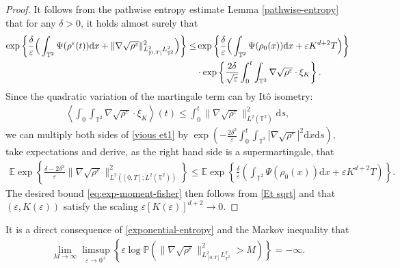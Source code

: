 \begin{proof}
It follows from the pathwise entropy estimate Lemma \ref{pathwise-entropy} that for any $\delta > 0$, it holds almost surely that
\begin{align}\label{vious et1}
  \exp\left\{\frac{\delta }{\varepsilon }\Big(\int_{\mathbb{T}^2}\Psi(\rho^{\varepsilon}(t))\mathrm{d}x+\|\nabla \sqrt{\rho^{\varepsilon}}\|_{L^2_{[0,T]}L^2_{\mathbb{T}^2}}^{2}\Big)\right\}
  \leq&\exp\left\{\frac{\delta}{\varepsilon }\Big(\int_{\mathbb{T}^2}\Psi(\rho_0(x))\mathrm{d}x+\varepsilon K^{d+2}T\Big)\right\}\notag\\
  &\cdot\exp\left\{\frac{2\delta}{\sqrt{\varepsilon}}\int_0^t\int_{\mathbb{T}^2}\nabla\sqrt{\rho^{\varepsilon}}\cdot\xi_K\right\}.
\end{align}
Since the quadratic variation of the martingale term can by It\^o isometry:
\begin{align*}
   \left\langle\int_{0}^{\cdot}\int_{\mathbb{T}^2}
\nabla\sqrt{\rho^{\varepsilon}}\cdot \xi_K\right\rangle(t) \leq \int_{0}^{t}
   \|\nabla\sqrt{\rho^{\varepsilon}}\|_{L^2(\mathbb{T}^2)}^2\mathrm{d}s,
\end{align*}
we can multiply both sides of \eqref{vious et1} by $\exp(
-\frac{2\delta^2}{\varepsilon }\int_{0}^{t}
   \int_{\mathbb{T}^2}|\nabla\sqrt{\rho^{\varepsilon}}|^2\mathrm{d}x\mathrm{d}s)$, take expectations and derive, as the right hand side is a supermartingale, that 
\begin{align}\label{Et sqrt}
\mathbb{E}\exp\left\{\frac{\delta-2\delta^2}{\varepsilon }\|\nabla \sqrt{\rho^{\varepsilon}}\|_{L^2([0,T];L^2(\mathbb{T}^2))}^{2}\right\}\leq \mathbb{E}\exp\left\{\frac{\delta }{\varepsilon }\left(\int_{\mathbb{T}^2}\Psi(\rho_0(x))\mathrm{d}x+\varepsilon K^{d+2}T\right)\right\}.
\end{align}
The desired bound \eqref{eq:exp-moment-fisher} then follows from \eqref{Et sqrt} and that $(\varepsilon, K(\varepsilon))$ satisfy the scaling $\varepsilon [K(\varepsilon)]^{d+2}\rightarrow 0$.
\end{proof}
It is a direct consequence of \eqref{exponential-entropy} and the Markov inequality that  
\begin{align}
\lim_{M\rightarrow \infty}\limsup_{\varepsilon\rightarrow 0^+} \left\{\varepsilon \log\mathbb{P}\left(\|\nabla\sqrt{\rho^{\varepsilon}}\|_{L^2_{[0,T]}L^2_{\mathbb{T}^2}}^2>M\right)\right\}=-\infty. 	
\end{align}

